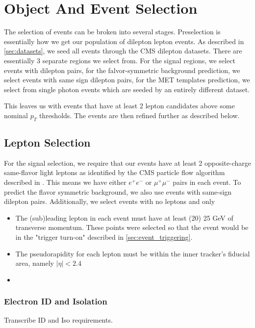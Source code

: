 \section{Object And Event Selection}

  The selection of events can be broken into several stages. Preselection is essentially how we get our population of dilepton lepton events. As described in \ref{sec:datasets}, we seed all events through the CMS dilepton datasets. There are essentially 3 separate regions we select from. For the signal regions, we select events with dilepton pairs, for the falvor-symmetric background prediction, we select events with same sign dilepton pairs, for the MET templates prediction, we select from single photon events which are seeded by an entirely different dataset.

  This leaves us with events that have at least 2 lepton candidates above some nominal $p_T$ thresholds. The events are then refined further as described below.
  
  \subsection{Lepton Selection}
    For the signal selection, we require that our events have at least 2 opposite-charge same-flavor light leptons as identified by the CMS particle flow algorithm described in . This means we have either $e^+e^-$ or $\mu^+ \mu^-$ pairs in each event. To predict the flavor symmetric background, we also use events with same-sign dilepton pairs. Additionally, we select events with no leptons and only

    \begin{itemize}
      \item The (sub)leading lepton in each event must have at least (20) 25 GeV of transverse momentum. These points were selected so that the event would be in the "trigger turn-on" described in \ref{sec:event_triggering}.
      \item The pseudorapidity for each lepton must be within the inner tracker's fiducial area, namely $\left|\eta\right| < 2.4$
      \item 
    \end{itemize}

    \subsubsection{Electron ID and Isolation}
    Transcribe ID and Iso requirements.

